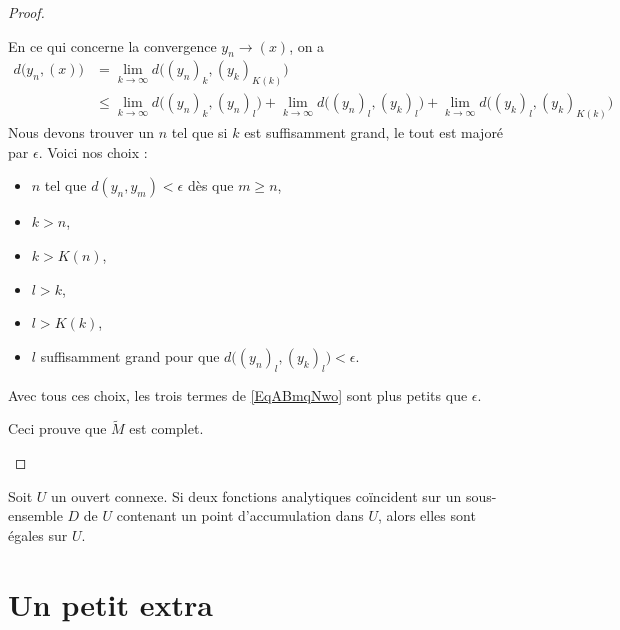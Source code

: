 \begin{proof}
\begin{subproof}
        En ce qui concerne la convergence \( y_n\to (x)\), on a 
        \begin{subequations}
            \begin{align}
                d\big( y_n,(x) \big)&=\lim_{k\to \infty} d\big( (y_n)_k,(y_k)_{K(k)} \big)\\
                &\leq \lim_{k\to \infty} d\big( (y_n)_k,(y_n)_l \big)+\lim_{k\to \infty} d\big( (y_n)_l,(y_k)_{l} \big)+\lim_{k\to \infty} d\big( (y_k)_l,(y_k)_{K(k)} \big)    \label{EqABmqNwo}
            \end{align}
        \end{subequations}
        Nous devons trouver un \( n\) tel que si \( k\) est suffisamment grand, le tout est majoré par \( \epsilon\). Voici nos choix :
        \begin{itemize}
            \item \( n\) tel que \( d(y_n,y_m)<\epsilon\) dès que \( m\geq n\),
            \item \( k>n\),
            \item \( k>K(n)\),
            \item \( l>k\),
            \item \( l>K(k)\),
            \item \( l\) suffisamment grand pour que \( d\big( (y_n)_l,(y_k)_l \big)<\epsilon\).
        \end{itemize}
        Avec tous ces choix, les trois termes de \eqref{EqABmqNwo} sont plus petits que \( \epsilon\).

        Ceci prouve que \( \tilde M\) est complet.
    \end{subproof}
\end{proof}

\begin{theorem}\label{ThoAVBCewB}
    Soit \( U\) un ouvert connexe. Si deux fonctions analytiques coïncident sur un sous-ensemble \( D\) de \( U\) contenant un point d'accumulation dans \( U\), alors elles sont égales sur \( U\).
\end{theorem}

					\section{Un petit extra}


